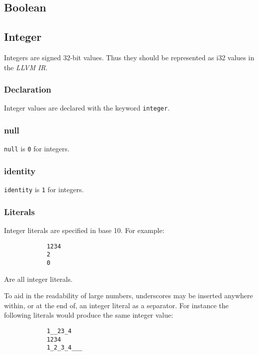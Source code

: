 \documentclass[../../gazprea.tex]{subfiles}
\begin{document}
\subsection{Boolean}
\label{ssec:boolean}


	\subsection{Integer}\label{sec:integer}

		Integers are signed 32-bit values. Thus they should be represented as i32 values in the \textit{LLVM IR}.

	\subsubsection{Declaration}

		Integer values are declared with the keyword \texttt{integer}.

	\subsubsection{null}

		\texttt{null} is \texttt{0} for integers.

	\subsubsection{identity}

		\texttt{identity} is \texttt{1} for integers.

	\subsubsection{Literals}
  \label{sssec:int_lit}

		Integer literals are specified in base 10. For example:

		\begin{lstlisting}
			1234
			2
			0
		\end{lstlisting}

		Are all integer literals.

		To aid in the readability of large numbers, underscores may be inserted anywhere within, or at the end of, an
		integer literal as a separator. For instance the following literals would produce the same integer value:

		\begin{lstlisting}
			1__23_4
			1234
			1_2_3_4___
		\end{lstlisting}
\end{document}
